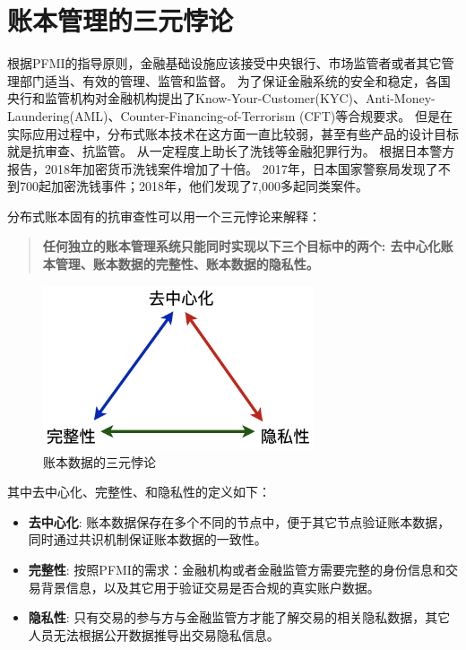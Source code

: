\section{账本管理的三元悖论}\label{sec:triangle}
根据PFMI的指导原则，金融基础设施应该接受中央银行、市场监管者或者其它管理部门适当、有效的管理、监管和监督。
为了保证金融系统的安全和稳定，各国央行和监管机构对金融机构提出了Know-Your-Customer(KYC)、Anti-Money-Laundering(AML)、Counter-Financing-of-Terrorism (CFT)等合规要求。
但是在实际应用过程中，分布式账本技术在这方面一直比较弱，甚至有些产品的设计目标就是抗审查、抗监管。
从一定程度上助长了洗钱等金融犯罪行为。
根据日本警方报告\cite{jp_report}，2018年加密货币洗钱案件增加了十倍。
2017年，日本国家警察局发现了不到700起加密洗钱事件；2018年，他们发现了7,000多起同类案件。

分布式账本固有的抗审查性可以用一个三元悖论来解释：

\begin{quotation}
    \textbf{任何独立的账本管理系统只能同时实现以下三个目标中的两个: 去中心化账本管理、账本数据的完整性、账本数据的隐私性。}
\end{quotation}

\begin{figure}[h!]
    \centering
    \includegraphics[width=8cm, keepaspectratio]{images/triangle.png}
    \caption{账本数据的三元悖论}
    \label{fig:triangle}
\end{figure}


其中去中心化、完整性、和隐私性的定义如下：
\begin{itemize}
    \item[\dag] \textbf{去中心化}:
    账本数据保存在多个不同的节点中，便于其它节点验证账本数据，同时通过共识机制保证账本数据的一致性。

    \item[\dag] \textbf{完整性}:
    按照PFMI的需求：金融机构或者金融监管方需要完整的身份信息和交易背景信息，以及其它用于验证交易是否合规的真实账户数据。
    
    \item[\dag] \textbf{隐私性}:
    只有交易的参与方与金融监管方才能了解交易的相关隐私数据，其它人员无法根据公开数据推导出交易隐私信息。
\end{itemize}

